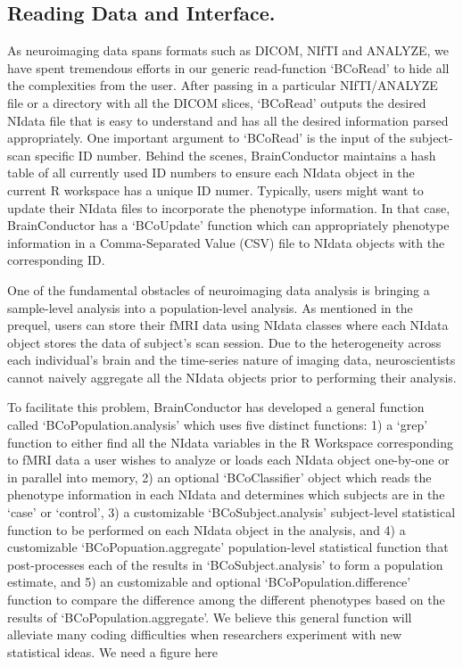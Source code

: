 \documentclass{nature}
\begin{document}
\subsection{Reading Data and Interface.}
As neuroimaging data spans formats such as DICOM, NIfTI and ANALYZE, we have 
spent tremendous efforts in our generic read-function `BCoRead' to hide
all the complexities from the user. After passing in a particular NIfTI/ANALYZE file
or a directory with all the DICOM slices, `BCoRead' outputs the desired NIdata file
that is easy to understand and has all the desired information parsed appropriately.
One important argument to `BCoRead' is the input of the subject-scan specific ID
number. Behind the
scenes, BrainConductor maintains a hash table of all currently used ID numbers to ensure
each NIdata object in the current R workspace has a unique ID numer.
Typically, users might want to update their NIdata files to incorporate the
phenotype information. In that case, BrainConductor has a `BCoUpdate' function
which can appropriately phenotype information in a Comma-Separated Value (CSV) file
to NIdata objects with the corresponding ID.

One of the fundamental obstacles of neuroimaging data analysis is bringing a sample-level
analysis into a population-level analysis. As mentioned in the prequel, users can
store their fMRI data using NIdata classes where each NIdata object stores the data of
subject's scan session. Due to the heterogeneity across each individual's brain and
the time-series nature of imaging data,
neuroscientists cannot naively aggregate all the NIdata objects prior to performing their
analysis. 

To facilitate this problem, BrainConductor has developed a general function called 
`BCoPopulation.analysis' which uses five distinct functions: 1) a `grep' function to either
find all the NIdata variables in the R Workspace corresponding to fMRI data a user wishes
to analyze or loads each NIdata object one-by-one or in parallel into memory, 
2) an optional `BCoClassifier' object which reads the phenotype information
in each NIdata and determines which subjects are in the `case' or `control', 3)
a customizable `BCoSubject.analysis' subject-level statistical function to be performed on each NIdata object in the
analysis, and 4) a customizable `BCoPopuation.aggregate' population-level statistical function
that post-processes each of the results in `BCoSubject.analysis' to form a population
estimate, and 5) an customizable and optional `BCoPopulation.difference' function
to compare the difference among the different phenotypes based on the 
results of `BCoPopulation.aggregate'. We believe this general
function will alleviate many coding difficulties when researchers experiment with
new statistical ideas. {\color{red}We need a figure here}
\end{document}
